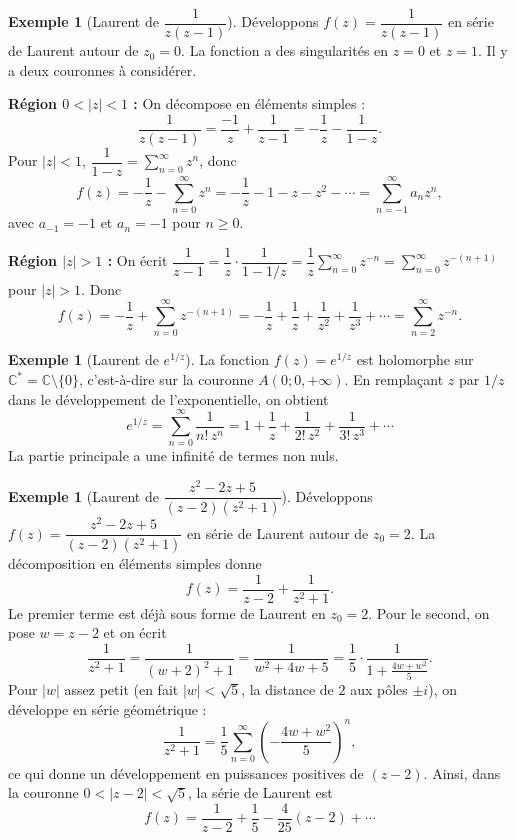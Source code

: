 \documentclass[12pt,a4paper,openany]{book}
\theoremstyle{definition}
\newtheorem{exemple}[definition]{Exemple}
\theoremstyle{plain}
\theoremstyle{remark}
\newcommand{\C}{\mathbb{C}}
\newcommand{\abs}[1]{\left|#1\right|}
\begin{document}
\begin{exemple}[Laurent de $\dfrac{1}{z(z-1)}$]\label{ex:laurent-1/z(z-1)}
Développons $f(z) = \dfrac{1}{z(z-1)}$ en série de Laurent autour de
$z_0 = 0$. La fonction a des singularités en $z = 0$ et $z = 1$.
Il y a deux couronnes à considérer.

\medskip
\noindent\textbf{Région $0 < \abs{z} < 1$ :}
On décompose en éléments simples :
\[
  \frac{1}{z(z-1)} = \frac{-1}{z} + \frac{1}{z-1}
  = -\frac{1}{z} - \frac{1}{1-z}.
\]
Pour $\abs{z} < 1$, $\dfrac{1}{1-z} = \sum_{n=0}^\infty z^n$, donc
\[
  f(z) = -\frac{1}{z} - \sum_{n=0}^{\infty} z^n
  = -\frac{1}{z} - 1 - z - z^2 - \cdots
  = \sum_{n=-1}^{\infty} a_n z^n,
\]
avec $a_{-1} = -1$ et $a_n = -1$ pour $n \geq 0$.

\medskip
\noindent\textbf{Région $\abs{z} > 1$ :}
On écrit $\dfrac{1}{z-1} = \dfrac{1}{z}\cdot\dfrac{1}{1-1/z}
= \dfrac{1}{z}\sum_{n=0}^\infty z^{-n} = \sum_{n=0}^\infty z^{-(n+1)}$
pour $\abs{z} > 1$. Donc
\[
  f(z) = -\frac{1}{z} + \sum_{n=0}^{\infty} z^{-(n+1)}
  = -\frac{1}{z} + \frac{1}{z} + \frac{1}{z^2} + \frac{1}{z^3} + \cdots
  = \sum_{n=2}^{\infty} z^{-n}.
\]
\end{exemple}

\begin{exemple}[Laurent de $e^{1/z}$]\label{ex:laurent-exp1/z}
La fonction $f(z) = e^{1/z}$ est holomorphe sur $\C^* = \C\setminus\{0\}$,
c'est-à-dire sur la couronne $A(0; 0, +\infty)$. En remplaçant $z$
par $1/z$ dans le développement de l'exponentielle, on obtient
\[
  e^{1/z} = \sum_{n=0}^{\infty} \frac{1}{n!\,z^n}
  = 1 + \frac{1}{z} + \frac{1}{2!\,z^2} + \frac{1}{3!\,z^3} + \cdots
\]
La partie principale a une infinité de termes non nuls.
\end{exemple}

\begin{exemple}[Laurent de $\dfrac{z^2-2z+5}{(z-2)(z^2+1)}$]\label{ex:laurent-partial}
Développons $f(z) = \dfrac{z^2-2z+5}{(z-2)(z^2+1)}$ en série de Laurent
autour de $z_0 = 2$. La décomposition en éléments simples donne
\[
  f(z) = \frac{1}{z-2} + \frac{1}{z^2+1}.
\]
Le premier terme est déjà sous forme de Laurent en $z_0 = 2$. Pour le
second, on pose $w = z - 2$ et on écrit
\[
  \frac{1}{z^2+1} = \frac{1}{(w+2)^2 + 1} = \frac{1}{w^2+4w+5}
  = \frac{1}{5}\cdot\frac{1}{1 + \frac{4w+w^2}{5}}.
\]
Pour $\abs{w}$ assez petit (en fait $\abs{w} < \sqrt{5}$, la distance
de $2$ aux pôles $\pm i$), on développe en série géométrique :
\[
  \frac{1}{z^2+1} = \frac{1}{5}\sum_{n=0}^\infty
  \left(-\frac{4w+w^2}{5}\right)^n,
\]
ce qui donne un développement en puissances positives de $(z-2)$.
Ainsi, dans la couronne $0 < \abs{z-2} < \sqrt{5}$, la série de Laurent
est
\[
  f(z) = \frac{1}{z-2} + \frac{1}{5} - \frac{4}{25}(z-2) + \cdots
\]
\end{exemple}
\end{document}
